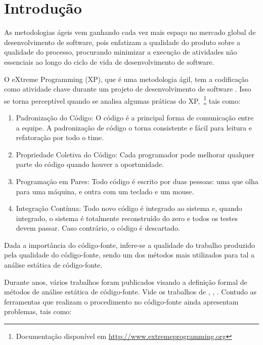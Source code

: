 \chapter{Introdução}

As metodologias ágeis vem ganhando cada vez mais espaço no mercado global 
de desenvolvimento de software, pois enfatizam a qualidade do produto 
sobre a qualidade do processo, procurando minimizar a execução 
de atividades não essenciais ao longo do ciclo de vida de 
desenvolvimento de software. 

O eXtreme Programming (XP), que é uma metodologia ágil, tem a codificação como 
atividade chave durante um projeto de desenvolvimento de software 
\cite{beck1999}. Isso se torna perceptível quando se analisa algumas práticas do 
XP,~\footnote{Documentação disponível em \url{http://www.extremeprogramming.org}}
tais como:

\begin{enumerate}
\item Padronização do Código: O código é a principal forma de comunicação entre 
a equipe. A padronização de código o torna consistente e fácil para leitura e 
refatoração por todo o time. 
\item Propriedade Coletiva do Código: Cada programador pode melhorar qualquer 
parte do código quando houver a oportunidade.
\item Programação em Pares: Todo código é escrito por duas pessoas: uma que olha 
para uma máquina, e outra com um teclado e um mouse.
\item Integração Contínua: Todo novo código é integrado ao sistema e, quando 
integrado, o sistema é totalmente reconstruído do zero e todos os testes devem 
passar. Caso contrário, o código é descartado.

\end{enumerate} 

Dada a importância do código-fonte, infere-se a qualidade do trabalho produzido 
pela qualidade do código-fonte, sendo um dos métodos mais utilizados
para tal a análise estática de código-fonte. 

Durante anos, vários trabalhos foram publicados visando a definição formal de 
métodos de análise estática de código-fonte. Vide os trabalhos de 
, , .
Contudo as ferramentas que realizam o procedimento no código-fonte ainda 
apresentam problemas, tais como:

